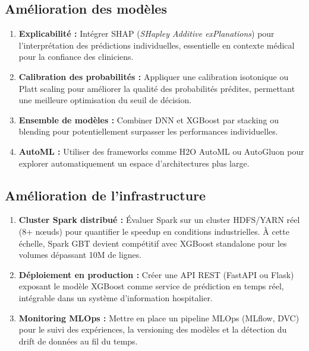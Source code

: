 \subsection{Amélioration des modèles}

\begin{enumerate}
    \item \textbf{Explicabilité :} Intégrer SHAP (\textit{SHapley Additive exPlanations}) \cite{lundberg2017} pour l'interprétation des prédictions individuelles, essentielle en contexte médical pour la confiance des cliniciens.

    \item \textbf{Calibration des probabilités :} Appliquer une calibration isotonique ou Platt scaling pour améliorer la qualité des probabilités prédites, permettant une meilleure optimisation du seuil de décision.

    \item \textbf{Ensemble de modèles :} Combiner DNN et XGBoost par stacking ou blending pour potentiellement surpasser les performances individuelles.

    \item \textbf{AutoML :} Utiliser des frameworks comme H2O AutoML ou AutoGluon pour explorer automatiquement un espace d'architectures plus large.
\end{enumerate}

\subsection{Amélioration de l'infrastructure}

\begin{enumerate}
    \item \textbf{Cluster Spark distribué :} Évaluer Spark sur un cluster HDFS/YARN réel (8+ nœuds) pour quantifier le speedup en conditions industrielles. À cette échelle, Spark GBT devient compétitif avec XGBoost standalone pour les volumes dépassant 10M de lignes.

    \item \textbf{Déploiement en production :} Créer une API REST (FastAPI ou Flask) exposant le modèle XGBoost comme service de prédiction en temps réel, intégrable dans un système d'information hospitalier.

    \item \textbf{Monitoring MLOps :} Mettre en place un pipeline MLOps (MLflow, DVC) pour le suivi des expériences, la versioning des modèles et la détection du drift de données au fil du temps.
\end{enumerate}

